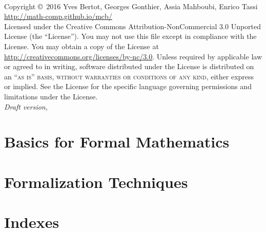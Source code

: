 \documentclass{book}
\begin{document}

\newpage
~\vfill
\thispagestyle{empty}

\noindent Copyright \copyright\ 2016 Yves Bertot, Georges Gonthier, Assia Mahboubi, Enrico Tassi\\ %


\noindent \url{http://math-comp.github.io/mcb/}\\ %

\noindent Licensed under the Creative Commons Attribution-NonCommercial 3.0 Unported License (the ``License''). You may not use this file except in compliance with the License. You may obtain a copy of the License at \url{http://creativecommons.org/licenses/by-nc/3.0}. Unless required by applicable law or agreed to in writing, software distributed under the License is distributed on an \textsc{``as is'' basis, without warranties or conditions of any kind}, either express or implied. See the License for the specific language governing permissions and limitations under the License.\\ %

\noindent \textit{Draft version,} %
\noindent \textit{}





\tableofcontents{}

\part{Basics for Formal Mathematics}\label{part:defproofs}








\part{Formalization Techniques}\label{part:form}






% 
% 
% 
% 
% 
% 
% 

\part{Indexes}

\printindex[concept]
\printindex[ssr]
\printindex[coq]
\printindex[vernac]



\end{document}
